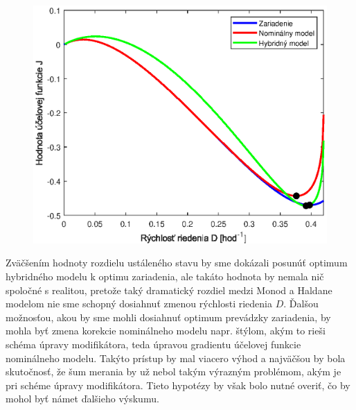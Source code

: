 \begin{figure}
	\centering
	\includegraphics[width=0.7\linewidth]{images/hybrid_and_monod_costFun_compar}
	\caption{}
	\label{fig:hybrid_and_monod_costFun_compar}
\end{figure}

Zväčšením hodnoty rozdielu ustáleného stavu by sme dokázali posunúť optimum hybridného modelu k optimu zariadenia, ale takáto hodnota by nemala nič spoločné s realitou, pretože taký dramatický rozdiel medzi Monod a Haldane modelom nie sme schopný dosiahnuť zmenou rýchlosti riedenia $ D $. Ďalšou možnosťou, akou by sme mohli dosiahnuť optimum prevádzky zariadenia, by mohla byť zmena korekcie nominálneho modelu napr. štýlom, akým to rieši schéma úpravy modifikátora, teda úpravou gradientu účelovej funkcie nominálneho modelu. Takýto prístup by mal viacero výhod a najväčšou by bola skutočnosť, že šum merania by už nebol takým výrazným problémom, akým je pri schéme úpravy modifikátora. Tieto hypotézy by však bolo nutné overiť, čo by mohol byť námet ďalšieho výskumu.